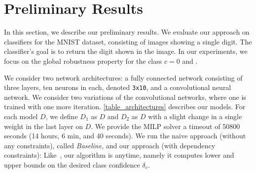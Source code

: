 
\section{Preliminary Results}
In this section, we describe our preliminary results.
We evaluate our approach on classifiers for the MNIST dataset, consisting of images showing a single digit.
The classifier's goal is to return the digit shown in the image. In our experiments, we focus on the global robustness property for the class $c=0$ and .

We consider two network architectures: 
a fully connected network consisting of three layers, ten neurons in each, denoted \texttt{3x10}, and a convolutional neural network. 
We consider two variations of the convolutional networks, where one is trained with one more iteration. \ref{table_architectures} describes our models. For each model $D$, we define $D_1$ as $D$ and $D_2$ as $D$ with a slight change in a single weight in the last layer on $D$. We provide the MILP solver a timeout of 50800 seconds (14 hours, 6 min, and 40 seconds). We run the naive approach (without any constraints), called \emph{Baseline}, and our approach (with dependency constraints):
Like~\cite{VHAGAR}, our algorithm is anytime, namely it computes lower and upper bounds on the desired class confidence $\delta_c$.

\begin{table}[H]
    \centering
    \caption{The networks used for this experience.
        \label{table_architectures}}
\end{table}

